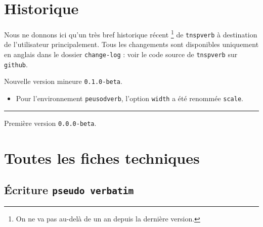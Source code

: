 \documentclass[12pt,a4paper]{article}
\theoremstyle{definition}
\newcommand\env[1]{\texttt{#1}}
\newcommand\separation{
    \medskip
    \hfill\rule{0.5\textwidth}{0.75pt}\hfill
    \medskip
}
\begin{document}
\newpage

\section{Historique}

Nous ne donnons ici qu'un très bref historique récent
\footnote{
	On ne va pas au-delà de un an depuis la dernière version.
}
de \verb+tnspverb+ à destination de l'utilisateur principalement.
Tous les changements sont disponibles uniquement en anglais dans le dossier \verb+change-log+ : voir le code source de \verb+tnspverb+ sur \verb+github+.

\begin{description}

    \medskip
    \item[2020-10-25] Nouvelle version mineure \verb+0.1.0-beta+.
    
    \begin{itemize}[itemsep=.5em]
        \item Pour l'environnement \env{peusodverb}, l'option \verb#width# a été renommée \verb#scale#.
    
    
    \end{itemize}
    
    \separation


    \medskip
    \item[2020-09-06] Première version \verb+0.0.0-beta+.


\end{description}


\newpage
\section{Toutes les fiches techniques} \label{techincal-ids}









\subsection{Écriture \texttt{pseudo verbatim}}
\end{document}
